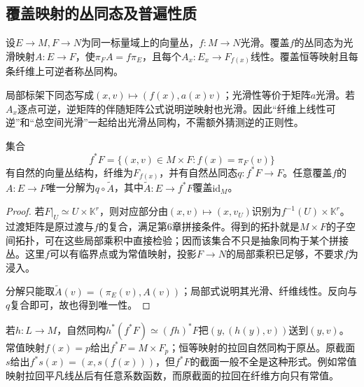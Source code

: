 \subsection{覆盖映射的丛同态及普遍性质}
\begin{definition}
设$E\to M,F\to N$为同一标量域上的向量丛，$f:M\to N$光滑。覆盖$f$的丛同态为光滑映射$A:E\to F$，使$\pi_F A=f\pi_E$，且每个$A_x:E_x\to F_{f(x)}$线性。覆盖恒等映射且每条纤维上可逆者称丛同构。
\end{definition}
局部标架下同态写成$(x,v)\mapsto(f(x),a(x)v)$；光滑性等价于矩阵$a$光滑。若$A_x$逐点可逆，逆矩阵的伴随矩阵公式说明逆映射也光滑。因此“纤维上线性可逆”和“总空间光滑”一起给出光滑丛同构，不需额外猜测逆的正则性。

\begin{proposition}\label{prop:bundle-pullback-universal}
集合
\[
 f^*F=\{(x,v)\in M\times F:f(x)=\pi_F(v)\}
\]
有自然的向量丛结构，纤维为$F_{f(x)}$，并有自然丛同态$q:f^*F\to F$。任意覆盖$f$的$A:E\to F$唯一分解为$q\circ\widetilde A$，其中$\widetilde A:E\to f^*F$覆盖$\mathrm{id}_M$。
\end{proposition}
\begin{proof}
若$F|_U\simeq U\times\mathbb K^r$，则对应部分由$(x,v)\mapsto(x,v_U)$识别为$f^{-1}(U)\times\mathbb K^r$。过渡矩阵是原过渡与$f$的复合，满足第6章拼接条件。得到的拓扑就是$M\times F$的子空间拓扑，可在这些局部乘积中直接检验；因而该集合不只是抽象同构于某个拼接丛。这里$f$可以有临界点或为常值映射，投影$F\to N$的局部乘积已足够，不要求$f$为浸入。

分解只能取$\widetilde A(v)=(\pi_E(v),A(v))$；局部式说明其光滑、纤维线性。反向与$q$复合即可，故也得到唯一性。
\end{proof}
若$h:L\to M$，自然同构$h^*(f^*F)\simeq(fh)^*F$把$(y,(h(y),v))$送到$(y,v)$。常值映射$f(x)=p$给出$f^*F=M\times F_p$；恒等映射的拉回自然同构于原丛。原截面$s$给出$f^*s(x)=(x,s(f(x)))$，但$f^*F$的截面一般不全是这种形式。例如常值映射拉回平凡线丛后有任意系数函数，而原截面的拉回在纤维方向只有常值。

